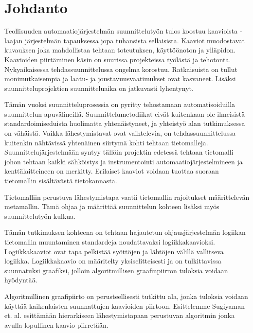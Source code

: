 \documentclass[finnish,12pt]{article}
\begin{document}
	\cleardoublepage
	\storeinipagenumber
	\setcounter{page}{1}

	\section{Johdanto}
	\thispagestyle{empty}

Teollisuuden automaatiojärjestelmän suunnittelutyön tulos koostuu kaavioista - laajan järjestelmän tapauksessa jopa tuhansista sellaisista. Kaaviot muodostavat kuvauksen joka mahdollistaa tehtaan toteutuksen, käyttöönoton ja ylläpidon. Kaavioiden piirtäminen käsin on suurissa projekteissa työlästä ja tehotonta. Nykyaikaisessa tehdassuunnittelussa ongelma korostuu. Ratkaisuista on tullut monimutkaisempia ja laatu- ja joustavuusvaatimukset ovat kasvaneet. Lisäksi suunnitteluprojektien suunnitteluaika on jatkuvasti lyhentynyt. \cite{RefWorks:41}

Tämän vuoksi suunnitteluprosessia on pyritty tehostamaan automatisoiduilla suunnittelun apuvälineillä. Suunnittelumetodiikat eivät kuitenkaan ole ilmeisistä standardoimiseduista huolimatta yhtenäistyneet, ja yhteistyö alan tutkimuksessa on vähäistä. Vaikka lähestymistavat ovat vaihtelevia, on tehdassuunnittelussa kuitenkin nähtävissä yhtenäinen siirtymä kohti tehtaan tietomalleja. Suunnittelujärjestelmään syntyy tällöin projektin edetessä tehtaan tietomalli johon tehtaan kaikki sähköistys ja instrumentointi automaatiojärjestelmineen ja kenttälaitteineen on merkitty. Erilaiset kaaviot voidaan tuottaa suoraan tietomallin sisältävästä tietokannasta.

Tietomalliin perustuva lähestymistapa vaatii tietomallin rajoitukset määrittelevän metamallin. Tämä ohjaa ja määrittää suunnittelun kohteen lisäksi myös suunnittelutyön kulkua.

Tämän tutkimuksen kohteena on tehtaan hajautetun ohjausjärjestelmän logiikan tietomallin muuntaminen standardeja noudattavaksi logiikkakaavioksi. Logiikkakaaviot ovat tapa pelkistää syöttöjen ja lähtöjen välillä vallitseva logiikka. Logiikkakaavio on määritelty yksiselitteisesti ja on tulkittavissa suunnatuksi graafiksi, jolloin algoritmillisen graafinpiirron tuloksia voidaan hyödyntää.

Algoritmillinen graafipiirto on perusteellisesti tutkittu ala, jonka tuloksia voidaan käyttää kaikenlaisten suunnattujen kaavioiden piirtoon. Esittelemme Sugiyaman et. al. \cite{RefWorks:9} esittämään hierarkiseen lähestymistapaan perustuvan algoritmin jonka avulla lopullinen kaavio piirretään.
\end{document}
